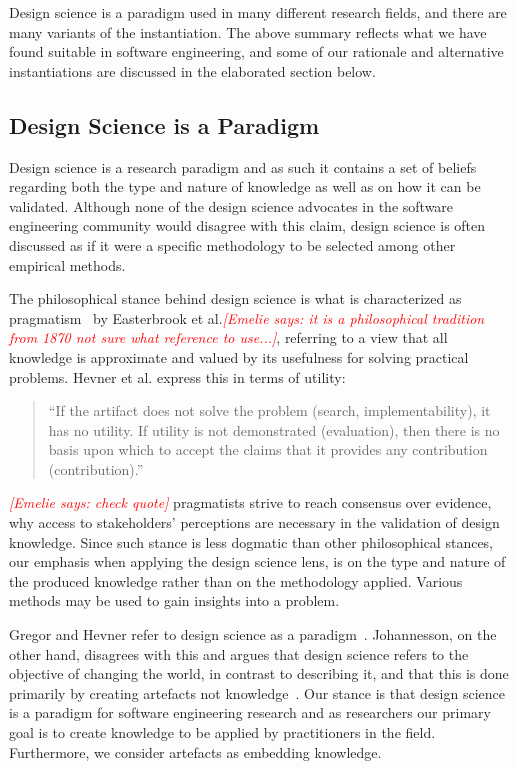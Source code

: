 \documentclass[graybox]{svmult}
\newcommand{\emelie}[1]{\textcolor{red}{{\it [Emelie says: #1]}}}
\newcommand{\emelie}[1]{}
\begin{document}
Design science is a paradigm used in many different research fields, and there are many variants of the instantiation. The above summary reflects what we have found suitable in software engineering, and some of our rationale and alternative instantiations are discussed in the elaborated section below.


\subsection{Design Science is a Paradigm}
Design science is a research paradigm and as such it contains a set of beliefs regarding both the type and nature of knowledge as well as on how it can be validated. Although none of the design science advocates in the software engineering community would disagree with this claim, design science is often discussed as if it were a specific methodology to be selected among other empirical methods. 

The philosophical stance behind design science is what is characterized as pragmatism~\cite{easterbrook_selecting_2008} by Easterbrook et al.\emelie{it is a philosophical tradition from 1870 not sure what reference to use...}, referring to a view that all knowledge is approximate and valued by its usefulness for solving practical problems. Hevner et al. express this in terms of utility: \begin{quote}
	``If the artifact does not solve the problem (search, implementability), it has no utility. If utility is not demonstrated (evaluation), then there is no basis upon which to accept the claims that it provides any contribution (contribution).''~\cite{hevner_design_2004}
\end{quote}\emelie{check quote} pragmatists strive to reach consensus over evidence, why access to stakeholders' perceptions are necessary in the validation of design knowledge. Since such stance is less dogmatic than other philosophical stances, our emphasis when applying the design science lens, is on the type and nature of the produced knowledge rather than on the methodology applied. Various methods may be used to gain insights into a problem.

Gregor and Hevner refer to design science as a paradigm~\cite{gregor_positioning_2013}. Johannesson, on the other hand, disagrees with this and argues that design science refers to the objective of changing the world, in contrast to describing it, and that this is done primarily by creating artefacts not knowledge~\cite{johannesson_introduction_2014}. Our stance is that design science is a paradigm for software engineering research and as researchers our primary goal is to create knowledge to be applied by practitioners in the field. Furthermore, we consider artefacts as embedding knowledge. 
\end{document}
